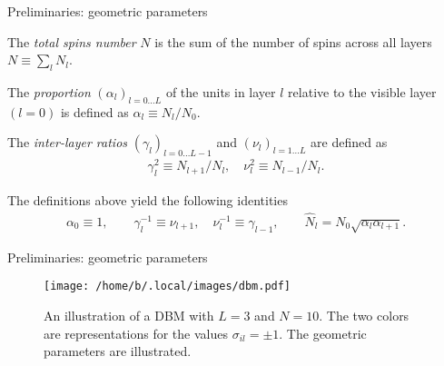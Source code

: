 \documentclass[8pt]{beamer}
\begin{document}
\begin{frame}[label={sec:org53dbd1a}]{Preliminaries: geometric parameters}
\begin{definition}
The \emph{total spins number} \(N\) is the sum of the number of spins across all layers \(N \equiv \sum_{l} N_l\). \hfill \blacksquare
\label{org1e129a9}
\end{definition}
\begin{definition}[Proportion]
The \emph{proportion} \((\alpha_{l})_{l=0\ldots L}\) of the units in layer \(l\) relative to the visible layer \((l = 0)\) is defined as \(\alpha_l \equiv N_l /N_{0}\). \hfill \blacksquare
\label{org115ac25}
\end{definition}
\begin{definition}
The \emph{inter-layer ratios} \((\gamma_{l})_{l=0 \ldots L-1}\) and \((\nu_{l})_{l=1 \ldots L}\) are defined as
\begin{align*}
\gamma_{l}^{2} \equiv N_{l+1} / N_{l}, \quad \nu_{l}^{2} \equiv N_{l-1} / N_{l}.
\end{align*}
\hfill \blacksquare
\label{orga0dc257}
\end{definition}
The definitions above yield the following identities
\begin{align*}
\alpha_{0} \equiv 1, \qquad \gamma_{l}^{-1} \equiv \nu_{l+1}, \quad \nu_{l}^{-1} \equiv \gamma_{l-1}, \qquad \widehat{N}_{l} = N_{0} \sqrt{\alpha_l \alpha_{l+1}}.
\end{align*}
\end{frame}

\begin{frame}[label={sec:org3d35695}]{Preliminaries: geometric parameters}
\begin{figure}[h]
  \centering
  \texttt{[image: /home/b/.local/images/dbm.pdf]}
  \caption{An illustration of a DBM with \(L = 3\) and \(N = 10\). The two colors are representations for the values \(\sigma_{il} = \pm 1\). The geometric parameters are illustrated.}
\end{figure}
\end{frame}
\end{document}
